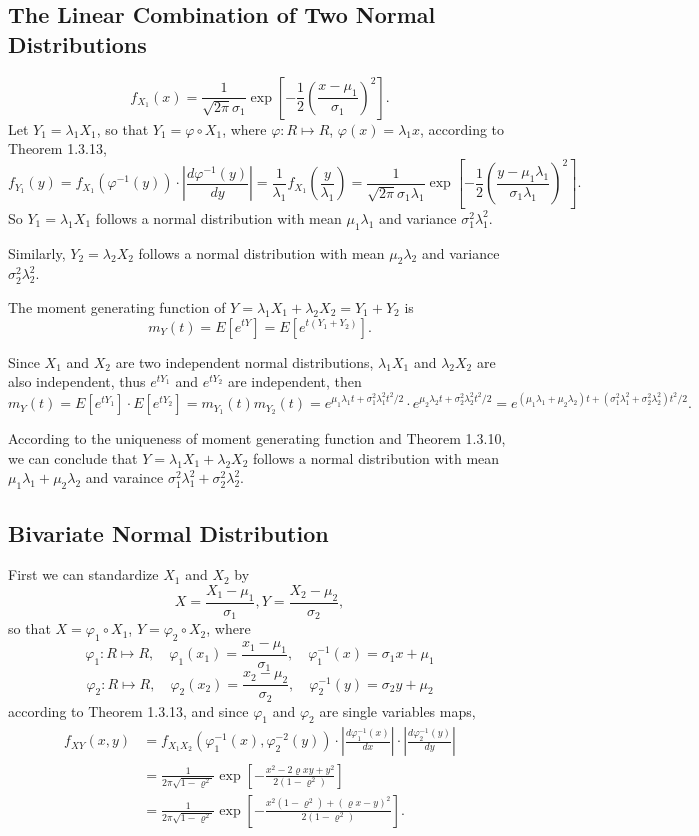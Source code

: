 \documentclass[11pt,a4paper]{article}
\begin{document}
\subsection{The Linear Combination of Two Normal Distributions}

$$f_{X_1}(x)=\frac{1}{\sqrt{2\pi}\sigma_1}\exp\left[-\frac{1}{2}\left(\frac{x-\mu_1}{\sigma_1}\right)^2\right].$$
Let $Y_1=\lambda_1X_1$, so that $Y_1=\varphi\circ X_1$, where $\varphi:R\mapsto R$, $\varphi(x)=\lambda_1 x$, according to Theorem 1.3.13,
$$f_{Y_1}(y)=f_{X_1}(\varphi^{-1}(y))\cdot\left|\frac{d\varphi^{-1}(y)}{dy}\right|=\frac{1}{\lambda_1}f_{X_1}\left(\frac{y}{\lambda_1}\right)=\frac{1}{\sqrt{2\pi}\sigma_1\lambda_1}\exp\left[-\frac{1}{2}\left(\frac{y-\mu_1\lambda_1}{\sigma_1\lambda_1}\right)^2\right].$$
So $Y_1=\lambda_1X_1$ follows a normal distribution with mean $\mu_1\lambda_1$ and variance $\sigma_1^2\lambda_1^2$.

Similarly, $Y_2=\lambda_2X_2$ follows a normal distribution with mean $\mu_2\lambda_2$ and variance $\sigma_2^2\lambda_2^2$.

The moment generating function of $Y=\lambda_1X_1+\lambda_2X_2=Y_1+Y_2$ is
$$m_Y(t)=E[e^{tY}]=E[e^{t(Y_1+Y_2)}].$$

Since $X_1$ and $X_2$ are two independent normal distributions, $\lambda_1X_1$ and $\lambda_2X_2$ are also independent, thus $e^{tY_1}$ and $e^{tY_2}$ are independent, then
$$m_Y(t)=E[e^{tY_1}]\cdot E[e^{tY_2}]=m_{Y_1}(t)m_{Y_2}(t)=e^{\mu_1\lambda_1t+\sigma_1^2\lambda_1^2t^2/2}\cdot e^{\mu_2\lambda_2t+\sigma_2^2\lambda_2^2t^2/2}=e^{(\mu_1\lambda_1+\mu_2\lambda_2)t+(\sigma_1^2\lambda_1^2+\sigma_2^2\lambda_2^2)t^2/2}.$$

According to the uniqueness of moment generating function and Theorem 1.3.10, we can conclude that $Y=\lambda_1X_1+\lambda_2X_2$ follows a normal distribution with mean $\mu_1\lambda_1+\mu_2\lambda_2$ and varaince $\sigma_1^2\lambda_1^2+\sigma_2^2\lambda_2^2$.

\subsection{Bivariate Normal Distribution}
First we can standardize $X_1$ and $X_2$ by
$$X=\frac{X_1-\mu_1}{\sigma_1},Y=\frac{X_2-\mu_2}{\sigma_2},$$
so that $X=\varphi_1\circ X_1$, $Y=\varphi_2\circ X_2$, where 
$$\varphi_1:R\mapsto R,\quad \varphi_1(x_1)=\frac{x_1-\mu_1}{\sigma_1},\quad\varphi_1^{-1}(x)=\sigma_1x+\mu_1$$
$$\varphi_2:R\mapsto R,\quad \varphi_2(x_2)=\frac{x_2-\mu_2}{\sigma_2},\quad\varphi_2^{-1}(y)=\sigma_2y+\mu_2$$
according to Theorem 1.3.13, and since $\varphi_1$ and $\varphi_2$ are single variables maps,
\begin{align*}
f_{XY}(x,y)&=f_{X_1X_2}(\varphi_1^{-1}(x),\varphi_2^{-2}(y))\cdot\left|\frac{d\varphi_1^{-1}(x)}{dx}\right|\cdot\left|\frac{d\varphi_2^{-1}(y)}{dy}\right|\\
&=\frac{1}{2\pi\sqrt{1-\varrho^2}}\exp\left[-\frac{x^2-2\varrho xy+y^2}{2(1-\varrho^2)}\right]\\
&=\frac{1}{2\pi\sqrt{1-\varrho^2}}\exp\left[-\frac{x^2(1-\varrho^2)+(\varrho x-y)^2}{2(1-\varrho^2)}\right].
\end{align*}
\end{document}
